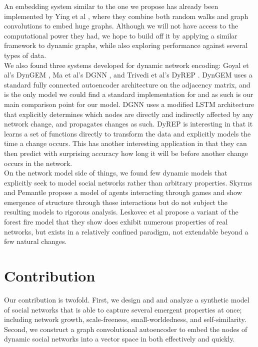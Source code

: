 \documentclass[12pt,twoside]{report}
\begin{document}
An embedding system similar to the one we propose has already been implemented by Ying et al \cite{ying2018graph}, where they combine both random walks and graph convolutions to embed huge graphs. Although we will not have access to the computational power they had, we hope to build off it by applying a similar framework to dynamic graphs, while also exploring performance against several types of data. \\

We also found three systems developed for dynamic network encoding: Goyal et al's DynGEM \cite{goyal2018dyngem}, Ma et al's DGNN \cite{ma2018dynamic}, and Trivedi et al's DyREP \cite{trivedi2018representation}. DynGEM uses a standard fully connected autoencoder architecture on the adjacency matrix, and is the only model we could find a standard implementation for and as such is our main comparison point for our model. DGNN uses a modified LSTM architecture that explicitly determines which nodes are directly and indirectly affected by any network change, and propagates changes as such. DyREP is interesting in that it learns a set of functions directly to transform the data and explicitly models the time a change occurs. This has another interesting application in that they can then predict with surprising accuracy how long it will be before another change occurs in the network. \\

On the network model side of things, we found few dynamic models that explicitly seek to model social networks rather than arbitrary properties. Skyrms and Pemantle \cite{skyrms2009dynamic} propose a model of agents interacting through games and show emergence of structure through those interactions but do not subject the resulting models to rigorous analysis. Leskovec et al \cite{leskovec2005graphs} propose a variant of the forest fire model that they show does exhibit numerous properties of real networks, but exists in a relatively confined paradigm, not extendable beyond a few natural changes. \\


\chapter{Contribution}
Our contribution is twofold. First, we design and and analyze a synthetic model of social networks that is able to capture several emergent properties at once; including network growth, scale-freeness, small-worldedness, and self-similarity. Second, we construct a graph convolutional autoencoder to embed the nodes of dynamic social networks into a vector space in both effectively and quickly. \\
\end{document}
